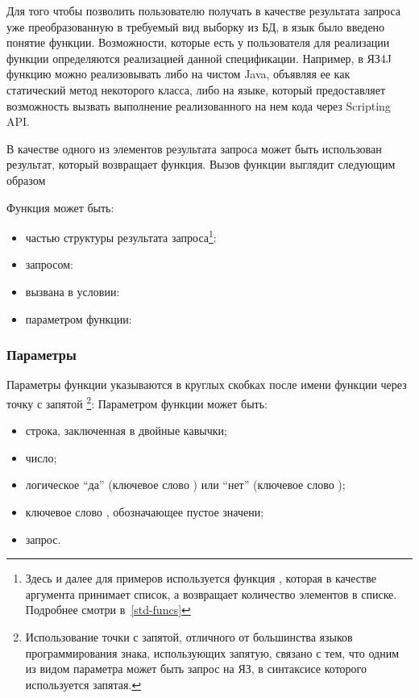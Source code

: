 Для того чтобы позволить пользователю получать в качестве результата запроса уже
преобразованную в требуемый вид выборку из БД, в язык было введено понятие функции.
Возможности, которые есть у пользователя для реализации функции определяются
реализацией данной спецификации. Например, в ЯЗ4J функцию
можно реализовывать либо на чистом Java, объявляя ее как статический метод некоторого класса, 
либо на языке, который предоставляет возможность вызвать выполнение реализованного на нем
кода через Scripting API.%

В качестве одного из элементов результата запроса может быть использован
результат, который возвращает функция. Вызов функции выглядит следующим образом

Функция может быть:
    \begin{itemize}\addtolength{\itemsep}{-0.7\baselineskip}
	\item частью структуры результата запроса\footnote{Здесь и далее для примеров используется функция
, которая в качестве аргумента принимает список, а возвращает количество элементов в списке.
Подробнее смотри в~\ref{std-funcs}}:
	\item запросом:
	\item вызвана в условии:
	\item параметром функции:
    \end{itemize}





\subsubsection{Параметры}\label{func-param}
Параметры функции указываются в круглых скобках после имени функции через точку с запятой
\footnote{Использование точки с запятой, отличного от большинства языков программирования знака, 
использующих запятую, связано с тем, что одним из видом параметра может быть запрос на ЯЗ, 
в синтаксисе которого используется запятая.}:
Параметром функции может быть: 
    \begin{itemize}\addtolength{\itemsep}{-0.7\baselineskip}
	\item строка, заключенная в двойные кавычки;
	\item число;
	\item логическое ``да'' (ключевое слово ) или ``нет'' (ключевое слово );
	\item ключевое слово , обозначающее пустое значени;
	\item запрос.
    \end{itemize}

